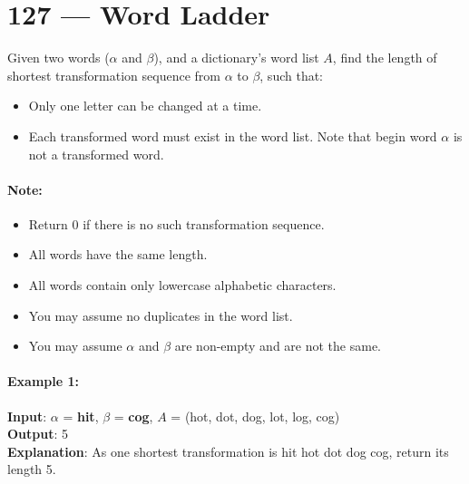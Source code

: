 \section{127 --- Word Ladder}
Given two words ($\alpha$ and $\beta$), and a dictionary's word list $A$, find the length of shortest transformation sequence from $\alpha$ to $\beta$, such that:
\begin{itemize}
\item Only one letter can be changed at a time.
\item Each transformed word must exist in the word list. Note that begin word $\alpha$ is not a transformed word.
\end{itemize}
\paragraph{Note:}
\begin{itemize}
\item Return 0 if there is no such transformation sequence.
\item All words have the same length.
\item All words contain only lowercase alphabetic characters.
\item You may assume no duplicates in the word list.
\item You may assume $\alpha$ and $\beta$ are non-empty and are not the same.
\end{itemize}
\paragraph{Example 1:}
\begin{flushleft}
\textbf{Input}: $\alpha$ = \textbf{hit}, $\beta$ = \textbf{cog}, $A$ = (hot, dot, dog, lot, log, cog)
\\
\textbf{Output}: 5
\\
\textbf{Explanation}: As one shortest transformation is hit \textrightarrow hot \textrightarrow dot \textrightarrow dog \textrightarrow cog, return its length 5.
\end{flushleft}
